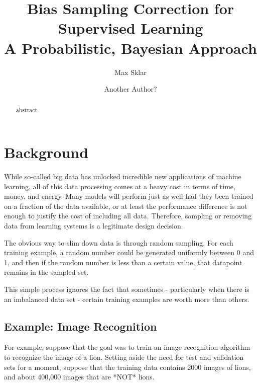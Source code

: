\documentclass[twoside]{article}
\begin{document}
\parindent=0in
\parskip=12pt

%
%
%
%

\title{
  Bias Sampling Correction for Supervised Learning \\
  \large{
    A  Probabilistic, Bayesian Approach
  }
}

\author{Max Sklar\\
\and
Another Author?
}

\maketitle
\thispagestyle{empty}

\begin{abstract}
abstract
\end{abstract}

\section{Background}

While so-called big data has unlocked incredible new applications of machine learning, all of this data processing comes at a heavy cost in terms of time, money, and energy. Many models will perform just as well had they been trained on a fraction of the data available, or at least the performance difference is not enough to justify the cost of including all data. Therefore, sampling or removing data from learning systems is a legitimate design decision.

The obvious way to slim down data is through random sampling. For each training example, a random number could be generated uniformly between 0 and 1, and then if the random number is less than a certain value, that datapoint remains in the sampled set.

This simple process ignores the fact that sometimes - particularly when there is an imbalanced data set - certain training examples are worth more than others.

\subsection{Example: Image Recognition}

For example, suppose that the goal was to train an image recognition algorithm to recognize the image of a lion. Setting aside the need for test and validation sets for a moment, suppose that the training data contains 2000 images of lions, and about 400,000 images that are *NOT* lions.
\end{document}
